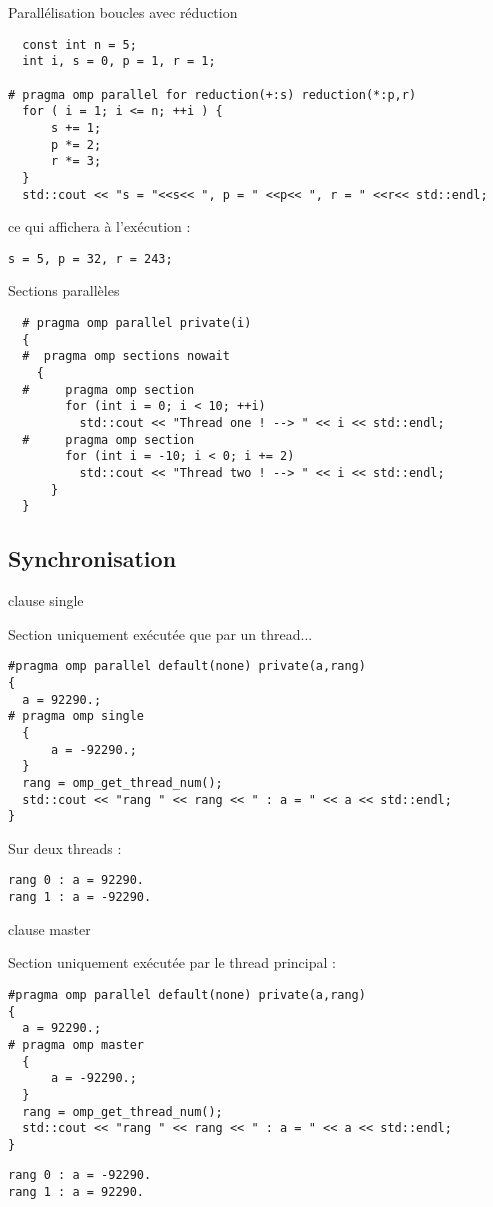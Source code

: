 \documentclass[handout,francais]{beamer}
\begin{document}
\begin{frame}[fragile]{Parallélisation boucles avec réduction}
\begin{lstlisting}
  const int n = 5;
  int i, s = 0, p = 1, r = 1;
  
# pragma omp parallel for reduction(+:s) reduction(*:p,r)
  for ( i = 1; i <= n; ++i ) {
      s += 1;
      p *= 2;
      r *= 3;
  }
  std::cout << "s = "<<s<< ", p = " <<p<< ", r = " <<r<< std::endl;
\end{lstlisting}

ce qui affichera à l'exécution :

\begin{verbatim}
s = 5, p = 32, r = 243;
\end{verbatim}
\end{frame}

\begin{frame}[fragile]{Sections parallèles}
\begin{lstlisting}
  # pragma omp parallel private(i)
  {
  #  pragma omp sections nowait
    {
  #     pragma omp section 
        for (int i = 0; i < 10; ++i)
          std::cout << "Thread one ! --> " << i << std::endl;
  #     pragma omp section
        for (int i = -10; i < 0; i += 2)
          std::cout << "Thread two ! --> " << i << std::endl;
      }
  }
\end{lstlisting}
\end{frame}

\subsection{Synchronisation}

\begin{frame}[fragile]{clause single}
 
Section uniquement exécutée que par un thread...
 
\begin{lstlisting}
#pragma omp parallel default(none) private(a,rang)
{
  a = 92290.;
# pragma omp single
  {
      a = -92290.;
  }
  rang = omp_get_thread_num();
  std::cout << "rang " << rang << " : a = " << a << std::endl;
}
\end{lstlisting}

Sur deux threads :
\begin{verbatim}
rang 0 : a = 92290.
rang 1 : a = -92290.
\end{verbatim}
\end{frame}

\begin{frame}[fragile]{clause master}

Section uniquement exécutée par le thread principal :
\begin{lstlisting}
#pragma omp parallel default(none) private(a,rang)
{
  a = 92290.;
# pragma omp master
  {
      a = -92290.;
  }
  rang = omp_get_thread_num();
  std::cout << "rang " << rang << " : a = " << a << std::endl;
}
\end{lstlisting}

\begin{verbatim}
rang 0 : a = -92290.
rang 1 : a = 92290.
\end{verbatim}
\end{frame}
\end{document}
